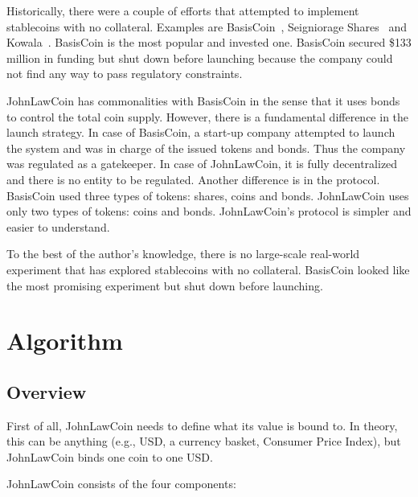 \documentclass[dvipdfmx,a4paper]{article}
\begin{document}
Historically, there were a couple of efforts that attempted to implement stablecoins with no collateral. Examples are BasisCoin~\cite{basiscoin}, Seigniorage Shares~\cite{seigniorage} and Kowala~\cite{kowala}. BasisCoin is the most popular and invested one. BasisCoin secured \$133 million in funding but shut down before launching because the company could not find any way to pass regulatory constraints.

JohnLawCoin has commonalities with BasisCoin in the sense that it uses bonds to control the total coin supply. However, there is a fundamental difference in the launch strategy. In case of BasisCoin, a start-up company attempted to launch the system and was in charge of the issued tokens and bonds. Thus the company was regulated as a gatekeeper. In case of JohnLawCoin, it is fully decentralized and there is no entity to be regulated. Another difference is in the protocol. BasisCoin used three types of tokens: shares, coins and bonds. JohnLawCoin uses only two types of tokens: coins and bonds. JohnLawCoin's protocol is simpler and easier to understand.

To the best of the author's knowledge, there is no large-scale real-world experiment that has explored stablecoins with no collateral. BasisCoin looked like the most promising experiment but shut down before launching.

\section{Algorithm}

\subsection{Overview}

First of all, JohnLawCoin needs to define what its value is bound to. In theory, this can be anything (e.g., USD, a currency basket, Consumer Price Index), but JohnLawCoin binds one coin to one USD.

JohnLawCoin consists of the four components:
\end{document}
